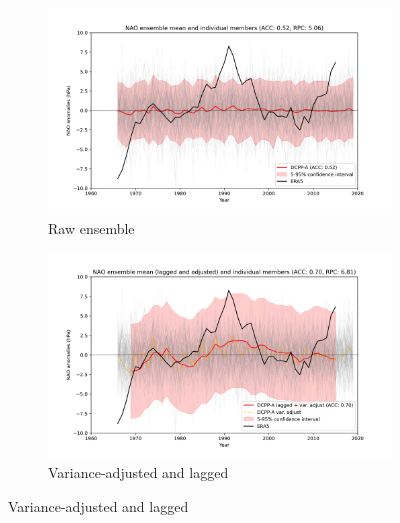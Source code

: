 \documentclass{article}
\begin{document}
\begin{figure}
     \centering
     \begin{subfigure}[b]{0.45\textwidth}
         \centering
         \includegraphics[width=\textwidth]{plots/nao_ensemble_mean_and_individual_members.png}
         \caption{Raw ensemble}
         \label{fig:raw-ensemble-multi-model-mean}
     \end{subfigure}
     \hfill
     \begin{subfigure}[b]{0.45\textwidth}
         \centering
         \includegraphics[width=\textwidth]{plots/nao_ensemble_mean_and_individual_members_lagged_and_adjusted.png}
         \caption{Variance-adjusted and lagged}
         \label{fig:lagged-ensemble-multi-model-mean}
     \end{subfigure}

\end{figure}
\end{document}
